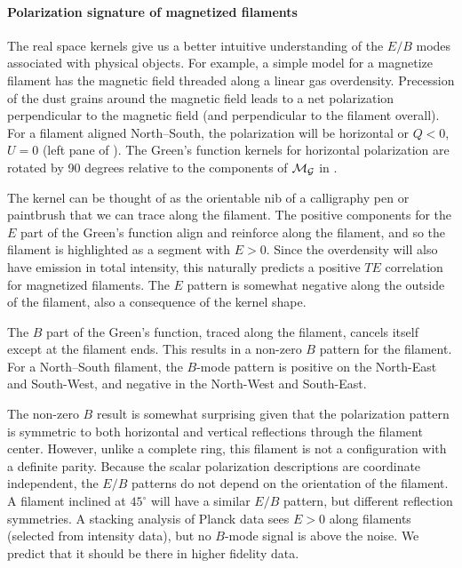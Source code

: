 \paragraph{Polarization signature of magnetized filaments}
The real space kernels give us a better intuitive understanding of the $E/B$ modes associated with physical objects.  For example, a simple model for a magnetize filament has the magnetic field threaded along a linear gas overdensity.  Precession of the dust grains around the magnetic field leads to a net polarization perpendicular to the magnetic field (and perpendicular to the filament overall).  For a filament aligned North--South, the polarization will be horizontal or $Q<0$, $U=0$ (left pane of ).  The Green's function kernels for horizontal polarization are rotated by 90 degrees relative to the components of $\cal{M}_G$ in .

The kernel can be thought of as the orientable nib of a calligraphy pen or paintbrush that we can trace along the filament.  The positive components for the $E$ part of the Green's function align and reinforce along the filament, and so the filament is highlighted as a segment with $E>0$.  Since the overdensity will also have emission in total intensity, this naturally predicts a positive $TE$ correlation for magnetized filaments.  The $E$ pattern is somewhat negative along the outside of the filament, also a consequence of the kernel shape.

The $B$ part of the Green's function, traced along the filament, cancels itself except at the filament ends.  This results in a non-zero $B$ pattern for the filament.  For a North--South filament, the $B$-mode pattern is positive on the North-East and South-West, and negative in the North-West and South-East.


The non-zero $B$ result is somewhat surprising given that the polarization pattern is symmetric to both horizontal and vertical reflections through the filament center.  However, unlike a complete ring, this filament is not a configuration with a definite parity.  Because the scalar polarization descriptions are coordinate independent, the $E/B$ patterns do not depend on the orientation of the filament.  A filament inclined at $45^\circ$ will have a similar $E/B$ pattern, but different reflection symmetries.  A stacking analysis of Planck data \citep{2016A&A...586A.141P} sees $E>0$ along filaments (selected from intensity data), but no $B$-mode signal is above the noise.  We predict that it should be there in higher fidelity data.

